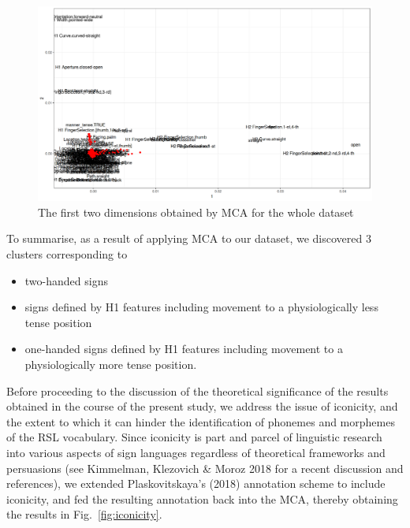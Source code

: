 \begin{figure}
\hypertarget{fig:vmeste}{%
\centering
\includegraphics{a-vot-vse-vmeste.png}
\caption{The first two dimensions obtained by MCA for the whole
dataset}\label{fig:vmeste}
}
\end{figure}

To summarise, as a result of applying MCA to our dataset, we discovered
3 clusters corresponding to

\begin{itemize}
\tightlist
\item
  two-handed signs
\item
  signs defined by H1 features including movement to a physiologically
  less tense position
\item
  one-handed signs defined by H1 features including movement to a
  physiologically more tense position.
\end{itemize}

Before proceeding to the discussion of the theoretical significance of
the results obtained in the course of the present study, we address the
issue of iconicity, and the extent to which it can hinder the
identification of phonemes and morphemes of the RSL vocabulary. Since
iconicity is part and parcel of linguistic research into various aspects
of sign languages regardless of theoretical frameworks and persuasions
(see Kimmelman, Klezovich \& Moroz 2018 for a recent discussion and
references), we extended Plaskovitskaya's (2018) annotation scheme to
include iconicity, and fed the resulting annotation back into the MCA,
thereby obtaining the results in Fig.~\ref{fig:iconicity}.

